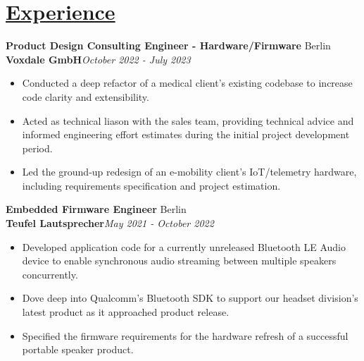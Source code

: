 \documentclass[a4paper, 11pt]{article}
\begin{document}
\section{\underline{Experience}}
  \textbf{Product Design Consulting Engineer - Hardware/Firmware} \hfill Berlin\\
  \textbf{Voxdale GmbH}\hfill \emph{October 2022 - July 2023}\smallskip
  \begin{itemize}[nosep]
    \item Conducted a deep refactor of a medical client's existing codebase to increase code clarity and extensibility.
    \item Acted as technical liason with the sales team, providing technical advice and informed engineering effort estimates during the initial project development period.
    \item Led the ground-up redesign of an e-mobility client's IoT/telemetry hardware, including requirements specification and project estimation.
  \end{itemize}
  \medskip

 \textbf{Embedded Firmware Engineer} \hfill Berlin\\
  \textbf{Teufel Lautsprecher}\hfill \emph{May 2021 - October 2022}\smallskip
  \begin{itemize}[nosep]
    \item Developed application code for a currently unreleased Bluetooth LE Audio device to enable synchronous audio streaming between multiple speakers concurrently.
    \item Dove deep into Qualcomm's Bluetooth SDK to support our headset division's latest product as it approached product release.
    \item Specified the firmware requirements for the hardware refresh of a successful portable speaker product.
  \end{itemize}
  \medskip
\end{document}
